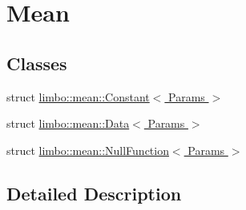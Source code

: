 \hypertarget{group__mean}{}\section{Mean}
\label{group__mean}
\subsection*{Classes}
\begin{DoxyCompactItemize}
\item 
struct \hyperlink{structlimbo_1_1mean_1_1_constant}{limbo\+::mean\+::\+Constant$<$ Params $>$}
\item 
struct \hyperlink{structlimbo_1_1mean_1_1_data}{limbo\+::mean\+::\+Data$<$ Params $>$}
\item 
struct \hyperlink{structlimbo_1_1mean_1_1_null_function}{limbo\+::mean\+::\+Null\+Function$<$ Params $>$}
\end{DoxyCompactItemize}


\subsection{Detailed Description}
